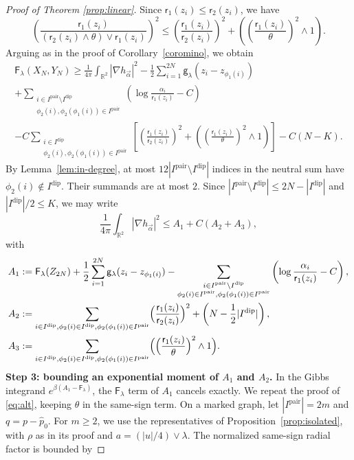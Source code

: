 \documentclass[a4paper,10pt,leqno]{amsart}
\numberwithin{equation}{section}
\newcommand{\R}{\mathbb{R}}
\def\hal{\frac{1}{2}}
\def\nab{\nabla}
\def\g{\mathsf{g}}
\def\F{\mathsf{F}}
\def\rr{\mathsf{r}}
\newcommand{\dip}{\mathrm{dip}}
\def\pair{\mathrm{pair}}
\begin{document}
\begin{proof}[Proof of Theorem \ref{prop:linear}]
  Since $\rr_1(z_i)\le\rr_2(z_i)$, we have
  \[
    \left(\frac{\rr_1(z_i)}{(\rr_2(z_i)\wedge\theta)\vee\rr_1(z_i)}\right)^2
    \le\left(\frac{\rr_1(z_i)}{\rr_2(z_i)}\right)^2
    +\left(\left(\frac{\rr_1(z_i)}\theta\right)^2\wedge1\right).
  \]
  Arguing as in the proof of Corollary~\ref{coromino}, we obtain
  \begin{multline*}
    \F_\lambda(X_N,Y_N)\ge\frac1{4\pi}\int_{\R^2}|\nab h_{\vec\alpha}|^2
    -\hal\sum_{i=1}^{2N}\g_\lambda(z_i-z_{\phi_1(i)})\\
    +\sum_{\substack{i\in I^\pair\setminus I^\dip\\\phi_2(i),\phi_2(\phi_1(i))\in I^\pair}}
    \left(\log\frac{\alpha_i}{\rr_1(z_i)}-C\right)\\
    -C\sum_{\substack{i\in I^\dip\\\phi_2(i),\phi_2(\phi_1(i))\in I^\pair}}
    \left[\left(\frac{\rr_1(z_i)}{\rr_2(z_i)}\right)^2
    +\left(\left(\frac{\rr_1(z_i)}\theta\right)^2\wedge1\right)\right]-C(N-K).
  \end{multline*}
  By Lemma~\ref{lem:in-degree}, at most $12|I^\pair\setminus I^\dip|$ indices in the neutral sum have $\phi_2(i)\notin I^\dip$. Their summands are at most $2$. Since $|I^\pair\setminus I^\dip|\le2N-|I^\dip|$ and $|I^\dip|/2\le K$, we may write
  \begin{equation*}
    \frac1{4\pi} \int_{\R^2} |\nabla h_{\vec{\alpha}}|^2\le A_1+C (A_2+A_3),
  \end{equation*}
  with
  \begin{align*}
    A_1&:= \F_\lambda(Z_{2N})+ \hal \sum_{ i=1}^{2N} \g_\lambda(z_i-z_{\phi_1(i)} )- \sum_{\substack{i\in I^{\pair}\backslash I^{\dip}\\ \phi_2(i) \in I^\pair, \phi_2(\phi_1(i)) \in I^\pair}}\left( \log
    \frac{\alpha_i}{\rr_1(z_i)}-C\right),
    \\
    A_2&:=\sum_{i\in I^{\dip},\phi_2(i)\in I^{\dip},\phi_2(\phi_1(i)) \in I^\pair } \Bigr(\frac{\rr_1(z_i)}{\rr_2(z_i) } \Bigr)^2 + \left(N-\frac12|I^\dip|\right),\\
    A_3&:=\sum_{i\in I^{\dip},\phi_2(i)\in I^{\dip} ,\phi_2(\phi_1(i)) \in I^\pair} \Bigl(\Bigr(\frac{\rr_1(z_i)}{{\theta} } \Bigr)^2 \wedge 1\Bigr).
  \end{align*}
  \textbf{Step 3: bounding an exponential moment of $A_1$ and $A_2$.}
  In the Gibbs integrand $e^{\beta(A_1-\F_\lambda)}$, the $\F_\lambda$ term of $A_1$ cancels exactly. We repeat the proof of \eqref{eq:alt}, keeping $\theta$ in the same-sign term. On a marked graph, let $|I^\pair|=2m$ and $q=p-\widehat p_0$. For $m\ge2$, we use the representatives of Proposition~\ref{prop:isolated}, with $\rho$ as in its proof and $a=(|u|/4)\vee\lambda$. The normalized same-sign radial factor is bounded by

\end{proof}
\end{document}
